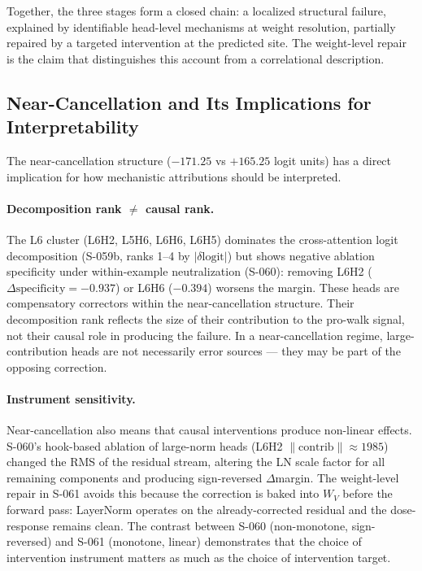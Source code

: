 Together, the three stages form a closed chain: a localized structural failure,
explained by identifiable head-level mechanisms at weight resolution, partially repaired
by a targeted intervention at the predicted site.
The weight-level repair is the claim that distinguishes this account from a correlational
description.

\subsection{Near-Cancellation and Its Implications for Interpretability}

The near-cancellation structure ($-171.25$ vs $+165.25$ logit units) has a direct
implication for how mechanistic attributions should be interpreted.

\paragraph{Decomposition rank $\neq$ causal rank.}
The L6 cluster (L6H2, L5H6, L6H6, L6H5) dominates the cross-attention logit
decomposition (S-059b, ranks 1--4 by $|\delta\text{logit}|$) but shows negative
ablation specificity under within-example neutralization (S-060): removing L6H2
($\Delta\text{specificity}=-0.937$) or L6H6 ($-0.394$) worsens the margin.
These heads are compensatory correctors within the near-cancellation structure.
Their decomposition rank reflects the size of their contribution to the pro-walk signal,
not their causal role in producing the failure.
In a near-cancellation regime, large-contribution heads are not necessarily error sources
--- they may be part of the opposing correction.

\paragraph{Instrument sensitivity.}
Near-cancellation also means that causal interventions produce non-linear effects.
S-060's hook-based ablation of large-norm heads (L6H2 $\|\text{contrib}\|\approx 1985$)
changed the RMS of the residual stream, altering the LN scale factor for all remaining
components and producing sign-reversed $\Delta$margin.
The weight-level repair in S-061 avoids this because the correction is baked into
$W_V$ before the forward pass: LayerNorm operates on the already-corrected residual
and the dose-response remains clean.
The contrast between S-060 (non-monotone, sign-reversed) and S-061 (monotone, linear)
demonstrates that the choice of intervention instrument matters as much as the choice
of intervention target.

